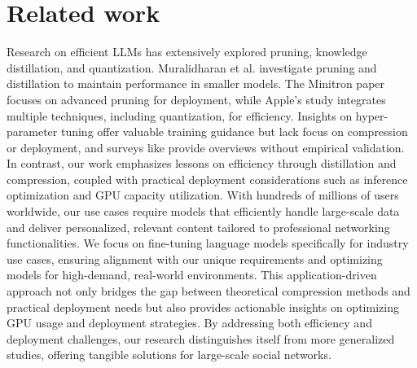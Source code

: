 \section{Related work}
\label{section:rel_work}

Research on efficient LLMs has extensively explored pruning, knowledge distillation, and quantization. Muralidharan et al. \cite{muralidharan2024compact} investigate pruning and distillation to maintain performance in smaller models. The Minitron paper \cite{muralidharan2024minitron} focuses on advanced pruning for deployment, while Apple's study \cite{gunter2024apple} integrates multiple techniques, including quantization, for efficiency. Insights on hyper-parameter tuning \cite{ashkboos2024computational, pareja2024unveiling} offer valuable training guidance but lack focus on compression or deployment, and surveys like \cite{zhu2023survey} provide overviews without empirical validation. In contrast, our work emphasizes lessons on efficiency through distillation and compression, coupled with practical deployment considerations such as inference optimization and GPU capacity utilization. With hundreds of millions of users worldwide, our use cases require models that efficiently handle large-scale data and deliver personalized, relevant content tailored to professional networking functionalities. We focus on fine-tuning language models specifically for industry use cases, ensuring alignment with our unique requirements and optimizing models for high-demand, real-world environments. This application-driven approach not only bridges the gap between theoretical compression methods and practical deployment needs but also provides actionable insights on optimizing GPU usage and deployment strategies. By addressing both efficiency and deployment challenges, our research distinguishes itself from more generalized studies, offering tangible solutions for large-scale social networks. 


